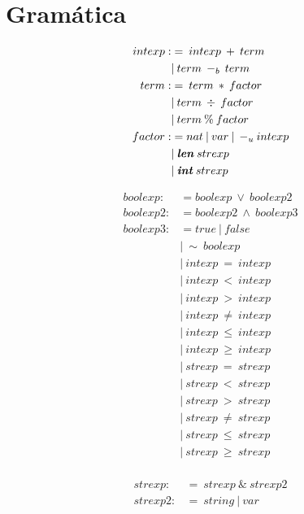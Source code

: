 \documentclass{article}
\begin{document}
    \section{Gramática}
\begin{align*}
    intexp :&= \: intexp \: + \: term \\
    &| \: term \: -_{b} \: term \\
    term :&= \: term \: * \: factor \\
    &| \: term \: \div \: factor \\
    &| \: term \: \% \: factor \\
    factor :&= nat \: | \: var \: | \: -_{u}intexp\\
    &| \: \textbf{\textit{len}} \: strexp \\
    &| \: \textbf{\textit{int}} \: strexp \\
\end{align*}

\begin{align*}
    boolexp :&= boolexp \: \vee \: boolexp2 \\
    boolexp2 :&= boolexp2 \: \wedge \: boolexp3 \\
    boolexp3 :&= true \: | \: false \\
    &| \: \sim \: boolexp \\
    &| \: intexp \: = \: intexp \\
    &| \: intexp \: < \: intexp \\
    &| \: intexp \: > \: intexp \\
    &| \: intexp \: \ne \: intexp \\
    &| \: intexp \: \leq \: intexp \\
    &| \: intexp \: \geq \: intexp \\
    &| \: strexp \: = \: strexp \\
    &| \: strexp \: < \: strexp \\
    &| \: strexp \: > \: strexp \\
    &| \: strexp \: \ne \: strexp \\
    &| \: strexp \: \leq \: strexp \\
    &| \: strexp \: \geq \: strexp \\
\end{align*}

\begin{align*}
    strexp :&= \: strexp \: \& \: strexp2 \\
    strexp2 :&= \: string \: | \: var \\
\end{align*}
\end{document}
